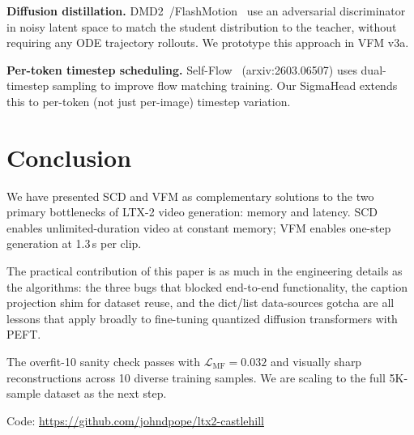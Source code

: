 \documentclass[10pt,twocolumn]{article}
\begin{document}
\textbf{Diffusion distillation.}
DMD2~\cite{dmd2}/FlashMotion~\cite{flashmotion} use an adversarial discriminator in noisy latent space to match the student distribution to the teacher, without requiring any ODE trajectory rollouts. We prototype this approach in VFM v3a.

\textbf{Per-token timestep scheduling.}
Self-Flow~\cite{selfflow} (arxiv:2603.06507) uses dual-timestep sampling to improve flow matching training. Our SigmaHead extends this to per-token (not just per-image) timestep variation.

\section{Conclusion}

We have presented SCD and VFM as complementary solutions to the two primary bottlenecks of LTX-2 video generation: memory and latency. SCD enables unlimited-duration video at constant memory; VFM enables one-step generation at 1.3\,s per clip.

The practical contribution of this paper is as much in the engineering details as the algorithms: the three bugs that blocked end-to-end functionality, the caption projection shim for dataset reuse, and the dict/list data-sources gotcha are all lessons that apply broadly to fine-tuning quantized diffusion transformers with PEFT.

The overfit-10 sanity check passes with $\mathcal{L}_{\text{MF}} = 0.032$ and visually sharp reconstructions across 10 diverse training samples. We are scaling to the full 5K-sample dataset as the next step.

Code: \url{https://github.com/johndpope/ltx2-castlehill}
\end{document}
